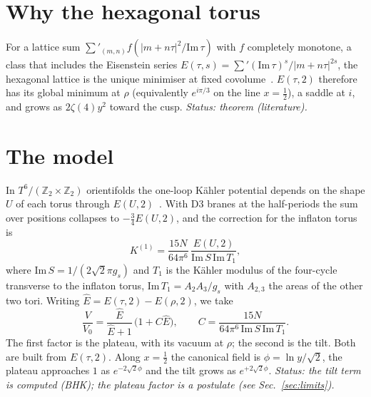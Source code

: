 \documentclass[aps,prd,twocolumn,superscriptaddress,nofootinbib,showkeys]{revtex4-2}
\begin{document}
\section{Why the hexagonal torus}
For a lattice sum $\sum'_{(m,n)}f(|m+n\tau|^2/\mathrm{Im}\,\tau)$ with $f$ completely monotone, a class that includes the Eisenstein series $E(\tau,s)=\sum'(\mathrm{Im}\,\tau)^s/|m+n\tau|^{2s}$, the hexagonal lattice is the unique minimiser at fixed covolume~\cite{Rankin,Montgomery,BlancLewin}. $E(\tau,2)$ therefore has its global minimum at $\rho$ (equivalently $e^{i\pi/3}$ on the line $x=\tfrac12$), a saddle at $i$, and grows as $2\zeta(4)y^2$ toward the cusp. \emph{Status: theorem (literature).}

\section{The model}
In $T^6/(\mathbb{Z}_2\times\mathbb{Z}_2)$ orientifolds the one-loop K\"ahler potential depends on the shape $U$ of each torus through $E(U,2)$~\cite{BHK}. With D3 branes at the half-periods the sum over positions collapses to $-\tfrac34E(U,2)$, and the correction for the inflaton torus is
\begin{equation}
K^{(1)}=\frac{15N}{64\pi^6}\,\frac{E(U,2)}{\mathrm{Im}\,S\,\mathrm{Im}\,T_1},
\end{equation}
where $\mathrm{Im}\,S=1/(2\sqrt2\pi g_s)$ and $T_1$ is the K\"ahler modulus of the four-cycle transverse to the inflaton torus, $\mathrm{Im}\,T_1=A_2A_3/g_s$ with $A_{2,3}$ the areas of the other two tori. Writing $\hat E=E(\tau,2)-E(\rho,2)$, we take
\begin{equation}
\frac{V}{V_0}=\frac{\hat E}{\hat E+1}\,\bigl(1+C\hat E\bigr),\qquad C=\frac{15N}{64\pi^6\,\mathrm{Im}\,S\,\mathrm{Im}\,T_1}.
\label{eq:V}
\end{equation}
The first factor is the plateau, with its vacuum at $\rho$; the second is the tilt. Both are built from $E(\tau,2)$. Along $x=\tfrac12$ the canonical field is $\phi=\ln y/\sqrt2$, the plateau approaches $1$ as $e^{-2\sqrt2\phi}$ and the tilt grows as $e^{+2\sqrt2\phi}$. \emph{Status: the tilt term is computed (BHK); the plateau factor is a postulate (see Sec.~\ref{sec:limits}).}
\end{document}
